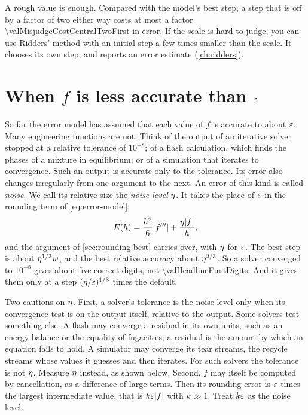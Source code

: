 A rough value is enough. Compared with the model's best step, a step that is off by a factor of two either way costs
 at most a factor \num{\valMisjudgeCostCentralTwoFirst} in error. If the scale is hard to judge, you
can use Ridders' method with an initial step a few times smaller than the scale. It chooses its own step, and reports
an error estimate (\cref{ch:ridders}).

\section{When $f$ is less accurate than $\varepsilon$}\label{sec:rounding-noise}

So far the error model has assumed that each value of $f$ is accurate to about $\varepsilon$. Many engineering functions
are not. Think of the output of an iterative solver stopped at a relative tolerance of $10^{-8}$; of a flash
calculation, which finds the phases of a mixture in equilibrium; or of a simulation that iterates to convergence.
Such an output is accurate only to the tolerance. Its error also changes irregularly from one argument to the next.
An error of this kind is called \emph{noise}. We call its relative size the \emph{noise level} $\eta$. It takes the
place of $\varepsilon$ in the rounding term of \cref{eq:error-model},
\begin{equation*}
  E(h) = \frac{h^2}{6} \lvert f''' \rvert + \frac{\eta \lvert f \rvert}{h},
\end{equation*}
and the argument of \cref{sec:rounding-best} carries over, with $\eta$ for $\varepsilon$. The best step is about
$\eta^{1/3} w$, and the best relative accuracy about $\eta^{2/3}$.\cite{more2012} So a solver converged to
$10^{-8}$ gives about five correct digits, not \num{\valHeadlineFirstDigits}. And it gives them only at a step
$(\eta / \varepsilon)^{1/3}$ times the default.

Two cautions on $\eta$. First, a solver's tolerance is the noise level only when its convergence test is on the
output itself, relative to the output. Some solvers test something else. A flash may converge a residual in its own
units, such as an energy balance or the equality of fugacities; a residual is the amount by which an equation fails
to hold. A simulator may converge its tear streams, the recycle streams whose values it guesses and then iterates.
For such solvers the tolerance is not $\eta$. Measure $\eta$ instead, as shown below. Second, $f$ may itself be
computed by cancellation, as a difference of large terms. Then its rounding error is $\varepsilon$ times the largest
intermediate value, that is $k \varepsilon \lvert f \rvert$ with $k \gg 1$. Treat $k \varepsilon$ as the noise level.

